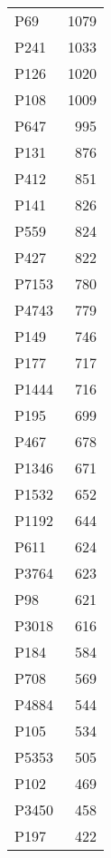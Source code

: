 \begin{tabular}{lr}
     P69 &                         1079 \\
    P241 &                         1033 \\
    P126 &                         1020 \\
    P108 &                         1009 \\
    P647 &                          995 \\
    P131 &                          876 \\
    P412 &                          851 \\
    P141 &                          826 \\
    P559 &                          824 \\
    P427 &                          822 \\
   P7153 &                          780 \\
   P4743 &                          779 \\
    P149 &                          746 \\
    P177 &                          717 \\
   P1444 &                          716 \\
    P195 &                          699 \\
    P467 &                          678 \\
   P1346 &                          671 \\
   P1532 &                          652 \\
   P1192 &                          644 \\
    P611 &                          624 \\
   P3764 &                          623 \\
     P98 &                          621 \\
   P3018 &                          616 \\
    P184 &                          584 \\
    P708 &                          569 \\
   P4884 &                          544 \\
    P105 &                          534 \\
   P5353 &                          505 \\
    P102 &                          469 \\
   P3450 &                          458 \\
    P197 &                          422 \\

\end{tabular}
